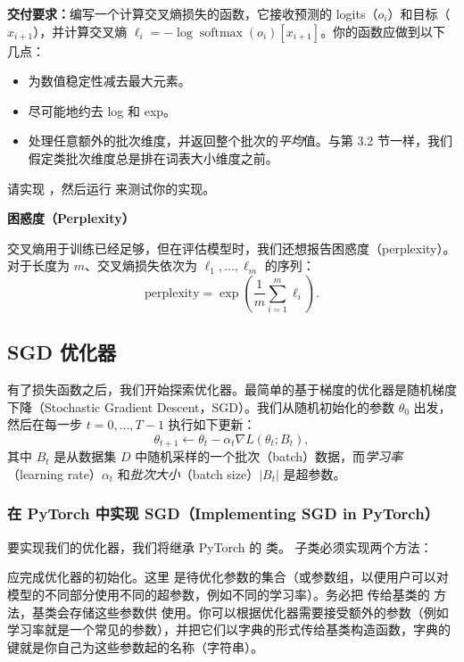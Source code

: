 \textbf{交付要求：}编写一个计算交叉熵损失的函数，它接收预测的 logits（$o_i$）和目标（$x_{i+1}$），并计算交叉熵 $\ell_i = -\log \operatorname{softmax}(o_i)[x_{i+1}]$。你的函数应做到以下几点：
\begin{itemize}
  \item 为数值稳定性减去最大元素。
  \item 尽可能地约去 log 和 exp。
  \item 处理任意额外的批次维度，并返回整个批次的\textit{平均}值。与第 3.2 节一样，我们假定类批次维度总是排在词表大小维度之前。
\end{itemize}
请实现 ，然后运行  来测试你的实现。

\textbf{困惑度（Perplexity）}

交叉熵用于训练已经足够，但在评估模型时，我们还想报告困惑度（perplexity）。对于长度为 $m$、交叉熵损失依次为 $\ell_1, \ldots, \ell_m$ 的序列：
\begin{equation}
\text{perplexity} = \exp\!\left(\frac{1}{m} \sum_{i=1}^{m} \ell_i\right).
\tag{18}
\end{equation}

\subsection{SGD 优化器}

有了损失函数之后，我们开始探索优化器。最简单的基于梯度的优化器是随机梯度下降（Stochastic Gradient Descent，SGD）。我们从随机初始化的参数 $\theta_0$ 出发，然后在每一步 $t = 0, \ldots, T-1$ 执行如下更新：
\begin{equation}
\theta_{t+1} \leftarrow \theta_t - \alpha_t \nabla L(\theta_t; B_t),
\tag{19}
\end{equation}
其中 $B_t$ 是从数据集 $D$ 中随机采样的一个批次（batch）数据，而\textit{学习率}（learning rate）$\alpha_t$ 和\textit{批次大小}（batch size）$|B_t|$ 是超参数。

\subsubsection{在 PyTorch 中实现 SGD（Implementing SGD in PyTorch）}

要实现我们的优化器，我们将继承 PyTorch 的  类。 子类必须实现两个方法：

\quad 应完成优化器的初始化。这里  是待优化参数的集合（或参数组，以便用户可以对模型的不同部分使用不同的超参数，例如不同的学习率）。务必把  传给基类的  方法，基类会存储这些参数供  使用。你可以根据优化器需要接受额外的参数（例如学习率就是一个常见的参数），并把它们以字典的形式传给基类构造函数，字典的键就是你自己为这些参数起的名称（字符串）。

